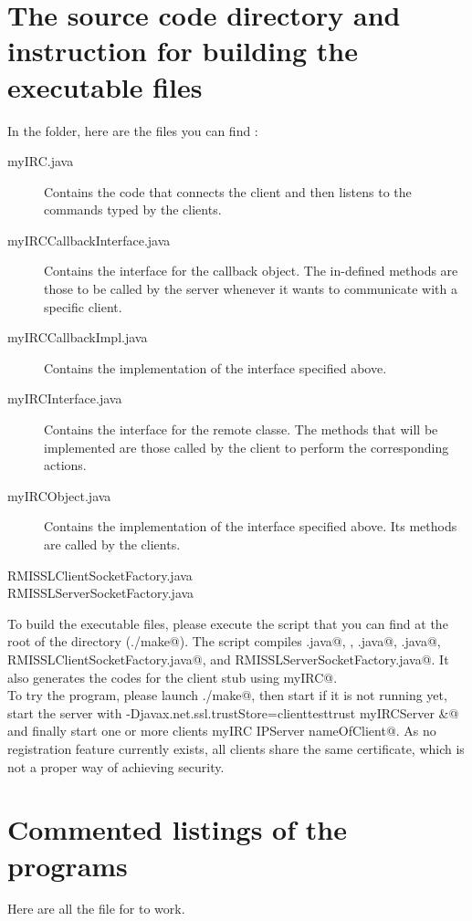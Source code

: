 \documentclass{article}
\begin{document}
\section{The source code directory and instruction for building the executable files}
In the \verb@src@ folder, here are the files you can find : 
\begin{description}
\item[myIRC.java] Contains the code that connects the client and then listens to the commands typed by the clients.
\item[myIRCCallbackInterface.java] Contains the interface for the callback object. The in-defined methods are those to be called by the server whenever it wants to communicate with a specific client.
\item[myIRCCallbackImpl.java] Contains the implementation of the interface specified above.
\item[myIRCInterface.java] Contains the interface for the remote classe. The methods that will be implemented are those called by the client to perform the corresponding actions.
\item[myIRCObject.java] Contains the implementation of the interface specified above. Its methods are called by the clients.
\item[RMISSLClientSocketFactory.java] 
\item[RMISSLServerSocketFactory.java] 
\end{description}

To build the executable files, please execute the script \verb@make@ that you can find at the root of the directory (\verb@./make@). The \verb@make@ script compiles \verb@myIRCObject.java@, \verb@myIRCCallbackImpl@, \verb@myIRCServer.java@, \verb@myIRC.java@, \verb@javac RMISSLClientSocketFactory.java@, and \verb@javac RMISSLServerSocketFactory.java@. It also generates the codes for the client stub using \verb@rmic myIRC@.\\

To try the program, please launch \verb@./make@, then start \verb@rmiregistry@ if it is not running yet, start the server with \verb@java -Djavax.net.ssl.trustStore=clienttesttrust myIRCServer &@ and finally start one or more clients \verb@java myIRC IPServer nameOfClient@. As no registration feature currently exists, all clients share the same certificate, which is not a proper way of achieving security.

\section{Commented listings of the programs}
Here are all the file for \verb@myIRC@ to work.
\end{document}
